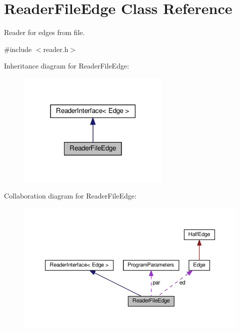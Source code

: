 \hypertarget{classReaderFileEdge}{}\section{Reader\+File\+Edge Class Reference}
\label{classReaderFileEdge}


Reader for edges from file.  




{\ttfamily \#include $<$reader.\+h$>$}



Inheritance diagram for Reader\+File\+Edge\+:\nopagebreak
\begin{figure}[H]
\begin{center}
\leavevmode
\includegraphics[width=207pt]{classReaderFileEdge__inherit__graph}
\end{center}
\end{figure}


Collaboration diagram for Reader\+File\+Edge\+:
\nopagebreak
\begin{figure}[H]
\begin{center}
\leavevmode
\includegraphics[width=350pt]{classReaderFileEdge__coll__graph}
\end{center}
\end{figure}
